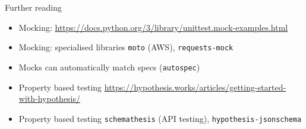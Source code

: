 \documentclass[11pt,xcolor={dvipsnames},hyperref={pdftex,pdfpagemode=UseNone,hidelinks,pdfdisplaydoctitle=true},usepdftitle=false]{beamer}
\begin{document}
\begin{frame}{Further reading}
\begin{itemize}
  \item Mocking: \url{https://docs.python.org/3/library/unittest.mock-examples.html}
  \item Mocking: specialised libraries \texttt{moto} (AWS), \texttt{requests-mock}
  \item Mocks can automatically match specs (\texttt{autospec})
  \item Property based testing \url{https://hypothesis.works/articles/getting-started-with-hypothesis/}
  \item Property based testing \texttt{schemathesis} (API testing), \texttt{hypothesis-jsonschema}
\end{itemize}
\end{frame}
\end{document}
